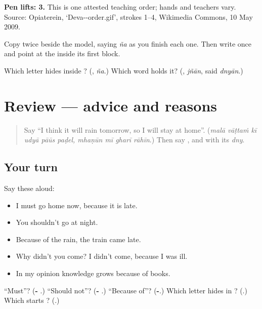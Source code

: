 \textbf{Pen lifts: 3.} This is one attested teaching order; hands and teachers vary. Source: Opiaterein, ‘Deva--order.gif’, strokes 1–4, Wikimedia Commons, 10 May 2009.

Copy \textbf{} twice beside the model, saying \emph{ña} as you finish each one. Then write \textbf{} once and point at the \textbf{} inside its first block.

\begin{tcolorbox}[breakable,colback=teal!4,colframe=teal!35!black,title={Before you move on}]
Which letter hides inside \textbf{}? (\textbf{}, \emph{ña}.) Which word holds it? (\textbf{}, \emph{jñān}, said \emph{dnyān}.)
\end{tcolorbox}
\section[(review)]{Review — advice and reasons}

\label{lesson:MR-R281-advice-and-reasons}



\begin{quote}
Say \textquotedblleft{}I think it will rain tomorrow, so I will stay at home\textquotedblright{}. (\emph{malā vāṭtaṁ kī udyā pāūs paḍel, mhaṇūn mī gharī rāhīn}.) Then say \textbf{}, and \textbf{} with its \emph{dny}.
\end{quote}

\subsection*{Your turn}
Say these aloud:

\begin{itemize}
\raggedright
  \item I must go home now, because it is late.
  \item You shouldn't go at night.
  \item Because of the rain, the train came late.
  \item Why didn't you come? I didn't come, because I was ill.
  \item In my opinion knowledge grows because of books.
\end{itemize}

\begin{tcolorbox}[breakable,colback=teal!4,colframe=teal!35!black,title={Before you move on}]
\textquotedblleft{}Must\textquotedblright{}? (\textbf{- }.) \textquotedblleft{}Should not\textquotedblright{}? (\textbf{- }.) \textquotedblleft{}Because of\textquotedblright{}? (\textbf{-}.) Which letter hides in \textbf{}? (\textbf{}.) Which starts \textbf{}? (\textbf{}.)
\end{tcolorbox}
